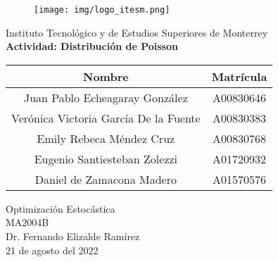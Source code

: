 \documentclass{article}
\begin{document}
    \begin{titlepage}
        \begin{center}
            \begin{figure}
                \centering
                \texttt{[image: img/logo\_itesm.png]}\\ %
            \end{figure}
        \vspace{5cm}
        \LARGE{Instituto Tecnológico y de Estudios Superiores de Monterrey}\\
        \fontsize{12}{14}\selectfont
        \vspace{1cm}
        \textbf{Actividad: Distribución de Poisson}\\ %
        \vspace{0.7cm}
        \begin{table}[h!]
            \centering
            \begin{tabular}{ ||c|c|| }
                \hline
                Nombre & Matrícula \\
                \hline
                Juan Pablo Echeagaray González & A00830646 \\
                \hline
                Verónica Victoria García De la Fuente & A00830383 \\
                \hline
                Emily Rebeca Méndez Cruz & A00830768 \\
                \hline
                Eugenio Santiesteban Zolezzi & A01720932 \\
                \hline
                Daniel de Zamacona Madero & A01570576 \\
                \hline
            \end{tabular}
        \end{table}
        \vspace{0.7cm}
        Optimización Estocástica\\ %
        \vspace{0.2cm}
        MA2004B\\ %
        \vspace{0.2cm}
        Dr. Fernando Elizalde Ramírez\\ %
        \vspace{0.7cm}
        21 de agosto del 2022\\ %
        \end{center}
    \end{titlepage}
\end{document}
